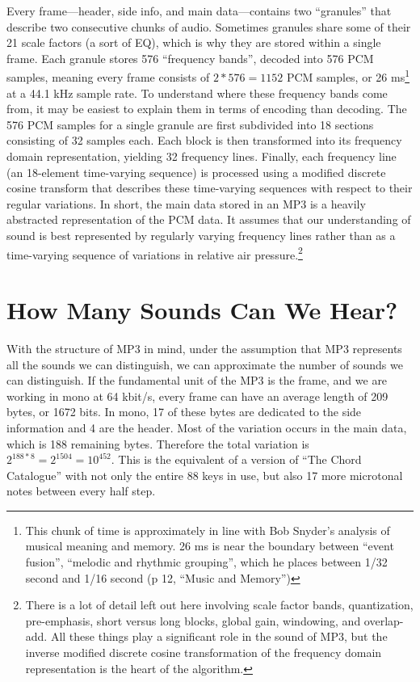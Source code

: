 \documentclass{thesis}
\begin{document}
Every frame---header, side info, and main data---contains two ``granules'' that describe two consecutive chunks of audio. Sometimes granules share some of their 21 scale factors (a sort of EQ), which is why they are stored within a single frame. Each granule stores 576 ``frequency bands'', decoded into 576 PCM samples, meaning every frame consists of $2*576=1152$ PCM samples, or 26 ms\footnote{This chunk of time is approximately in line with Bob Snyder's analysis of musical meaning and memory. 26 ms is near the boundary between ``event fusion'', ``melodic and rhythmic grouping'', which he places between 1/32 second and 1/16 second (p 12, ``Music and Memory'')} at a 44.1 kHz sample rate. To understand where these frequency bands come from, it may be easiest to explain them in terms of encoding than decoding. The 576 PCM samples for a single granule are first subdivided into 18 sections consisting of 32 samples each. Each block is then transformed into its frequency domain representation, yielding 32 frequency lines. Finally, each frequency line (an 18-element time-varying sequence) is processed using a modified discrete cosine transform that describes these time-varying sequences with respect to their regular variations. In short, the main data stored in an MP3 is a heavily abstracted representation of the PCM data. It assumes that our understanding of sound is best represented by regularly varying frequency lines rather than as a time-varying sequence of variations in relative air pressure.\footnote{There is a lot of detail left out here involving scale factor bands, quantization, pre-emphasis, short versus long blocks, global gain, windowing, and overlap-add. All these things play a significant role in the sound of MP3, but the inverse modified discrete cosine transformation of the frequency domain representation is the heart of the algorithm.}
	
\section{How Many Sounds Can We Hear?}

With the structure of MP3 in mind, under the assumption that MP3 represents all the sounds we can distinguish, we can approximate the number of sounds we can distinguish. If the fundamental unit of the MP3 is the frame, and we are working in mono at 64 kbit/s, every frame can have an average length of 209 bytes, or 1672 bits. In mono, 17 of these bytes are dedicated to the side information and 4 are the header. Most of the variation occurs in the main data, which is 188 remaining bytes. Therefore the total variation is $2^{188*8}=2^{1504}=10^{452}$. This is the equivalent of a version of ``The Chord Catalogue'' with not only the entire 88 keys in use, but also 17 more microtonal notes between every half step.
\end{document}
